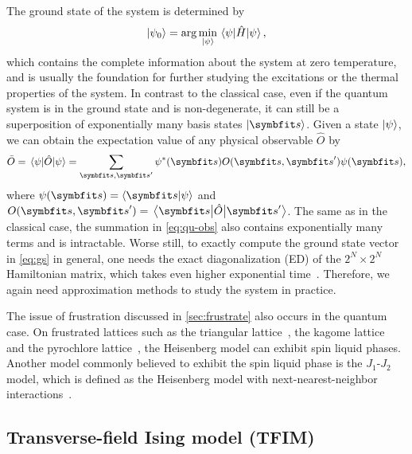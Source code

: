 The ground state of the system is determined by
\begin{equation}
\ket{\psi_0} = \arg\min_{\ket{\psi}} \ev{\hat{H}}{\psi},
\label{eq:gs}
\end{equation}
which contains the complete information about the system at zero temperature, and is usually the foundation for further studying the excitations or the thermal properties of the system. In contrast to the classical case, even if the quantum system is in the ground state and is non-degenerate, it can still be a superposition of exponentially many basis states $\ket{\vs}$. Given a state $\ket{\psi}$, we can obtain the expectation value of any physical observable $\hat{O}$ by
\begin{equation}
\bar{O} = \ev{\hat{O}}{\psi} = \sum_{\vs, \vs'} \psi^*(\vs) O(\vs, \vs') \psi(\vs),
\label{eq:qu-obs}
\end{equation}
where $\psi(\vs) = \ip{\vs}{\psi}$ and $O(\vs, \vs') = \mel{\vs}{\hat{O}}{\vs'}$. The same as in the classical case, the summation in \cref{eq:qu-obs} also contains exponentially many terms and is intractable. Worse still, to exactly compute the ground state vector in \cref{eq:gs} in general, one needs the exact diagonalization (ED) of the $2^N \times 2^N$ Hamiltonian matrix, which takes even higher exponential time~\cite{weisse2008exact}. Therefore, we again need approximation methods to study the system in practice.

The issue of frustration discussed in \cref{sec:frustrate} also occurs in the quantum case. On frustrated lattices such as the triangular lattice~\cite{li2015rare}, the kagome lattice~\cite{norman2016colloquium} and the pyrochlore lattice~\cite{moessner1998properties}, the Heisenberg model can exhibit spin liquid phases. Another model commonly believed to exhibit the spin liquid phase is the $J_1$-$J_2$ model, which is defined as the Heisenberg model with next-nearest-neighbor interactions~\cite{dagotto1989phase, schulz1996magnetic, hu2013direct, liu2018gapless}.


\subsection{Transverse-field Ising model (TFIM)}
\label{sec:qu-ising}

